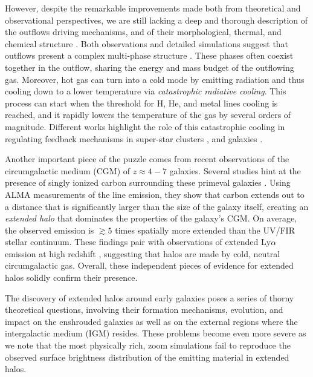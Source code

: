 However, despite the remarkable improvements made both from theoretical and observational perspectives, we are still lacking a deep and thorough description of the outflows driving mechanisms, and of their morphological, thermal, and chemical structure \citep{heckman2017galactic}. Both observations and detailed simulations suggest that outflows present a complex multi-phase structure \citep{murray2011, hopkins2014, muratov2015,pandya2021characterizing}. These phases often coexist together in the outflow, sharing the energy and mass budget of the outflowing gas. Moreover, hot gas can turn into a cold mode by emitting radiation and thus cooling down to a lower temperature via \textit{catastrophic radiative cooling}. This process can start when the threshold for H, He, and metal lines cooling is reached, and it rapidly lowers the temperature of the gas by several orders of magnitude. Different works highlight the role of this catastrophic cooling in regulating feedback mechanisms in super-star clusters \citep{Silich:2004,gray2019catastrophic}, and galaxies \citep{Wang:1995, sarkar:2015, Thompson16, Schneider:2018, Gronke&Oh:2020}.

Another important piece of the puzzle comes from recent observations of the circumgalactic medium (CGM) of $z\approx4-7$ galaxies. Several studies hint at the presence of singly ionized carbon surrounding these primeval galaxies \citep{Fujimoto19, Fujimoto:2020qzo, ginolfi:2019, herrera2021kiloparsec}. Using ALMA measurements of the \CII line emission, they show that carbon extends out to a distance that is significantly larger than the size of the galaxy itself, creating an \textit{extended halo} that dominates the properties of the galaxy's CGM. On average, the observed emission is $\gtrsim 5$ times spatially more extended than the UV/FIR stellar continuum. These findings pair with observations of extended Ly$\alpha$ emission at high redshift \citep{Wisotzki16,Wisotzki18, Kakuma19}, suggesting that halos are made by cold, neutral circumgalactic gas. Overall, these independent pieces of evidence for extended halos solidly confirm their presence. 

The discovery of extended halos around early galaxies poses a series of thorny theoretical questions, involving their formation mechanisms, evolution, and impact on the enshrouded galaxies as well as on the external regions where the intergalactic medium (IGM) resides. These problems become even more severe as we note that the most physically rich, zoom simulations \citep{pallottini2017b, Arata:2019} fail to reproduce the observed surface brightness distribution of the emitting material in extended halos.

